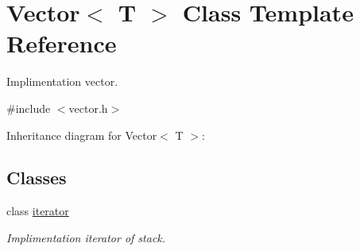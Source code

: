 \hypertarget{classVector}{}\section{Vector$<$ T $>$ Class Template Reference}
\label{classVector}


Implimentation vector.  




{\ttfamily \#include $<$vector.\+h$>$}



Inheritance diagram for Vector$<$ T $>$\+:
\subsection*{Classes}
\begin{DoxyCompactItemize}
\item 
class \hyperlink{classVector_1_1iterator}{iterator}
\begin{DoxyCompactList}\small\item\em Implimentation iterator of stack. \end{DoxyCompactList}\end{DoxyCompactItemize}
